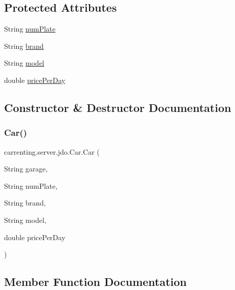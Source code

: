 \subsection*{Protected Attributes}
\begin{DoxyCompactItemize}
\item 
String \mbox{\hyperlink{classcarrenting_1_1server_1_1jdo_1_1_car_a6d3bb3a60ca384974c0beea5a4357ebf}{num\+Plate}}
\item 
String \mbox{\hyperlink{classcarrenting_1_1server_1_1jdo_1_1_car_a346b3365c2ed154c6beb8e25e6d589fd}{brand}}
\item 
String \mbox{\hyperlink{classcarrenting_1_1server_1_1jdo_1_1_car_a75a4e7429929308edefb22ee35b9a29d}{model}}
\item 
double \mbox{\hyperlink{classcarrenting_1_1server_1_1jdo_1_1_car_aa583f558d71242bee5e30c610beb50dd}{price\+Per\+Day}}
\end{DoxyCompactItemize}


\subsection{Constructor \& Destructor Documentation}
\mbox{\label{classcarrenting_1_1server_1_1jdo_1_1_car_ab43f746c910fab7cbc39e73aa9911384}} 
\subsubsection{\texorpdfstring{Car()}{Car()}}
{\footnotesize\ttfamily carrenting.\+server.\+jdo.\+Car.\+Car (\begin{DoxyParamCaption}\item[{String}]{garage,  }\item[{String}]{num\+Plate,  }\item[{String}]{brand,  }\item[{String}]{model,  }\item[{double}]{price\+Per\+Day }\end{DoxyParamCaption})}



\subsection{Member Function Documentation}
\mbox{\label{classcarrenting_1_1server_1_1jdo_1_1_car_a45425648e8ef3708cc79cb6895ae8c06}} 
